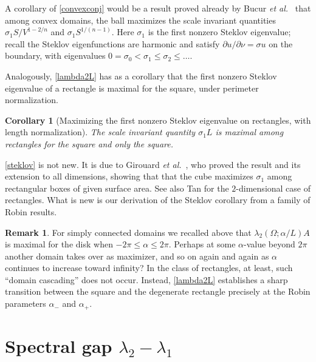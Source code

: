 \documentclass[12pt,reqno]{amsart}
\newtheorem{corollary}[corollary]{Corollary}
\theoremstyle{definition}
\newtheorem*{remark}{Remark}
\begin{document}
A corollary of \autoref{convexconj} would be a result proved already by Bucur \emph{et al.}\ \cite[Theorem 3.1]{BFNT17} that among convex domains, the ball maximizes the scale invariant quantities $\sigma_1 S/V^{1-2/n}$ and $\sigma_1 S^{1/(n-1)}$. Here $\sigma_1$ is the first nonzero Steklov eigenvalue; recall the Steklov eigenfunctions are harmonic and satisfy $\partial u/\partial \nu = \sigma u$ on the boundary, with eigenvalues $0=\sigma_0 < \sigma_1 \leq \sigma_2 \leq \dots$. 

Analogously, \autoref{lambda2L} has as a corollary that the first nonzero Steklov eigenvalue of a rectangle is maximal for the square, under perimeter normalization. 
%
\begin{corollary}[Maximizing the first nonzero Steklov eigenvalue on rectangles, with length normalization] \label{steklov}
The scale invariant quantity $\sigma_1 L$ is maximal among rectangles for the square and only the square. 
\end{corollary}
%
\autoref{steklov} is not new. It is due to Girouard \emph{et al.}\ \cite[Theorem 1.6]{GLPS17}, who proved the result and its extension to all dimensions, showing that that the cube maximizes $\sigma_1$ among rectangular boxes of given surface area. See also Tan \cite{T17} for the $2$-dimensional case of rectangles. What is new is our derivation of the Steklov corollary from a family of Robin results.  

\begin{remark}
For simply connected domains we recalled above that $\lambda_2(\Omega;\alpha/L)A$ is maximal for the disk when $-2\pi \leq \alpha \leq 2\pi$. Perhaps at some $\alpha$-value beyond $2\pi$ another domain  takes over as maximizer, and so on again and again as $\alpha$ continues to increase toward infinity? In the class of rectangles, at least, such ``domain cascading'' does not occur. Instead, \autoref{lambda2L} establishes a sharp transition between the square and the degenerate rectangle precisely at the Robin parameters $\alpha_-$ and $\alpha_+$. 
\end{remark}


\section*{Spectral gap $\lambda_2-\lambda_1$}
\end{document}
